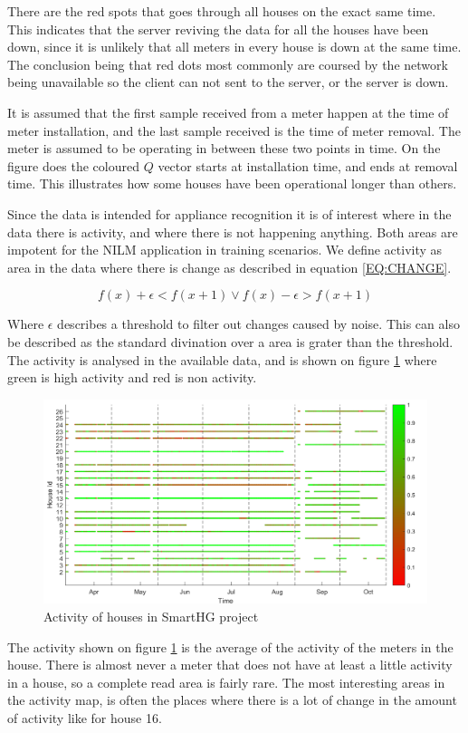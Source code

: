 There are the red spots that goes through all houses on the exact same time. This indicates that the server reviving the data for all the houses have been down, since it is unlikely that all meters in every house is down at the same time. The conclusion being that red dots most commonly are coursed by the network being unavailable so the client can not sent to the server, or the server is down. 

It is assumed that the first sample received from a meter happen at the time of meter installation, and the last sample received is the time of meter removal. The meter is assumed to be operating in between these two points in time. On the figure does the coloured $Q$ vector starts at installation time, and ends at removal time. This illustrates how some houses have been operational longer than others. 

Since the data is intended for appliance recognition it is of interest where in the data there is activity, and where there is not happening anything. Both areas are impotent for the NILM application in training scenarios. We define activity as area in the data where there is change as described in equation \ref{EQ:CHANGE}.

\begin{equation}
f(x) + \epsilon < f(x+1) \vee f(x) - \epsilon > f(x+1)
\label{EQ:CHANGE}
\end{equation}

Where $\epsilon$ describes a threshold to filter out changes caused by noise. This can also be described as the standard divination over a area is grater than the threshold. The activity is analysed in the available data, and is shown on figure \ref{fig:ActivityMap} where green is high activity and red is non activity. 

\begin{figure}[H]
\centering
\includegraphics[width=1\textwidth]{billeder/ActivityBig.png}
\caption{Activity of houses in SmartHG project}
\label{fig:ActivityMap}
\end{figure}

The activity shown on figure \ref{fig:ActivityMap} is the average of the activity of the meters in the house. There is almost never a meter that does not have at least a little activity in a house, so a complete read area is fairly rare. The most interesting areas in the activity map, is often the places where there is a lot of change in the amount of activity like for house 16.

